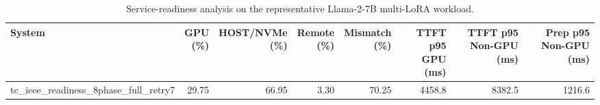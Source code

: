 \begin{table}[t]
\centering
\caption{Service-readiness analysis on the representative Llama-2-7B multi-LoRA workload.}
\label{tab:service_readiness}
\setlength{\tabcolsep}{2.4pt}
\renewcommand{\arraystretch}{1.10}
\begin{tabular}{lrrrrrrr}
\hline
System & \shortstack{GPU\\(\%)} & \shortstack{HOST/NVMe\\(\%)} & \shortstack{Remote\\(\%)} & \shortstack{Mismatch\\(\%)} & \shortstack{TTFT p95\\GPU (ms)} & \shortstack{TTFT p95\\Non-GPU (ms)} & \shortstack{Prep p95\\Non-GPU (ms)} \\
\hline
tc_ieee_readiness_8phase_full_retry7 & 29.75 & 66.95 & 3.30 & 70.25 & 4458.8 & 8382.5 & 1216.6 \\
\hline
\end{tabular}
\end{table}
